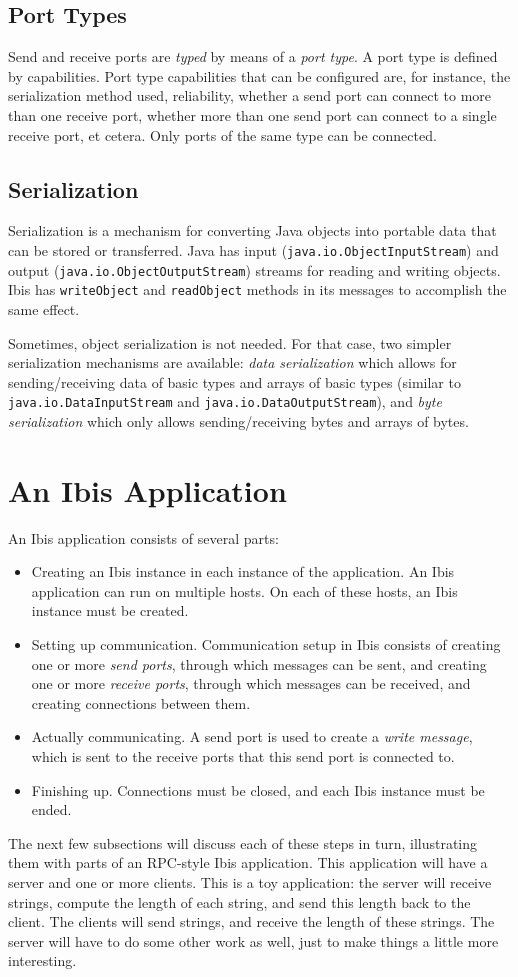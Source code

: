 \documentclass[10pt]{article}
\newcommand{\mysection}[1]{\section{#1}\label{#1}}
\newcommand{\mysubsection}[1]{\subsection{#1}\label{#1}}
\begin{document}
\mysubsection{Port Types}

Send and receive ports are \emph{typed} by means of a \emph{port type}.
A port type is defined by capabilities.
Port type capabilities that can be configured are, for instance, the
serialization method used, reliability, whether a send port can connect
to more than one receive port, whether more than one send port can connect
to a single receive port, et cetera.
Only ports of the same type can be connected.

\mysubsection{Serialization}

Serialization is a mechanism for converting Java objects
into portable data that can be stored or transferred.
Java has input
(\texttt{java.io.ObjectInputStream})
and output
(\texttt{java.io.ObjectOutputStream})
streams for reading and writing
objects.
Ibis has \texttt{writeObject} and \texttt{readObject} methods in
its messages to accomplish the same effect. 

Sometimes, object serialization is not needed. For that case,
two simpler serialization mechanisms are available: \emph{data
serialization} which allows for sending/receiving data of basic types
and arrays of basic types (similar to \texttt{java.io.DataInputStream}
and \texttt{java.io.DataOutputStream}), and \emph{byte serialization}
which only allows sending/receiving bytes and arrays of bytes.

\mysection{An Ibis Application}

An Ibis application consists of several parts:
\begin{itemize}
\item
Creating an Ibis instance in each instance of the application.
An Ibis application can run on multiple hosts.
On each of these hosts, an Ibis instance must be created.
\item
Setting up communication. Communication setup in Ibis
consists of creating one or more \emph{send ports}, through which messages
can be sent, and creating one or more \emph{receive ports},
through which messages can be received, and creating connections between them.
\item
Actually communicating. A send port is used to create a 
\emph{write message}, which is sent to the receive ports that this send port
is connected to.
\item
Finishing up. Connections must be closed, and each Ibis instance must
be ended.
\end{itemize}
\noindent
The next few subsections will discuss each of these steps in turn,
illustrating them with parts of an RPC-style Ibis application.
This application will have a server and one or more clients. This is a toy
application: the server will receive strings, compute the length of each string,
and send this length back to the client.
The clients will send strings, and receive the length of these strings.
The server will have to do some other work as well, just to make
things a little more interesting.
\end{document}
